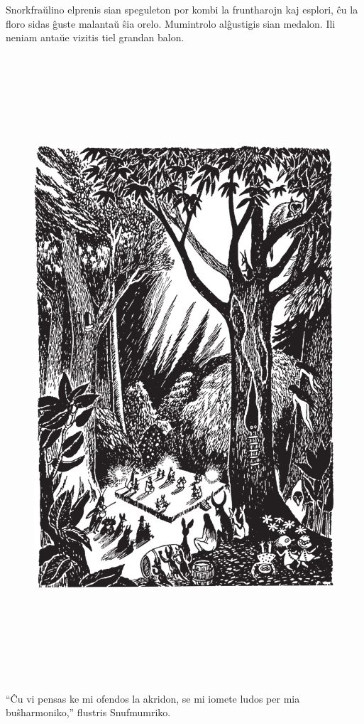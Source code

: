 Snorkfraŭlino elprenis sian speguleton por kombi la fruntharojn kaj esplori, ĉu la floro sidas ĝuste malantaŭ ŝia orelo. Mumintrolo alĝustigis sian medalon. Ili neniam antaŭe vizitis tiel grandan balon.

\begin{figure}[htbp]
\centering
\includegraphics[width=450pt,height=658pt]{6-6.png}
\caption{}
\label{6-6}
\end{figure}

``Ĉu vi pensas ke mi ofendos la akridon, se mi iomete ludos per mia buŝharmoniko,'' flustris Snufmumriko.

